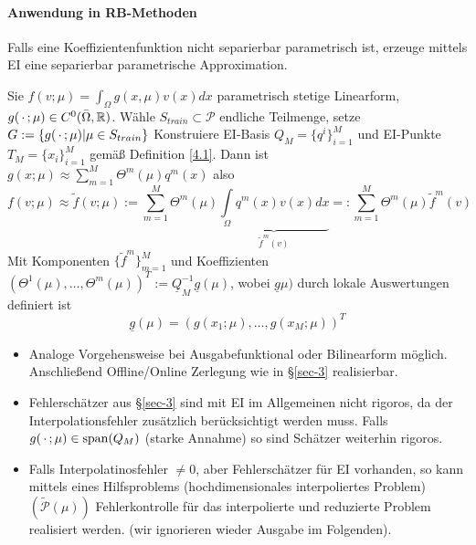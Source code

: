 \begin{satz}
\end{satz}
\begin{satz}
\end{satz}
\begin{satz}
\end{satz}
\begin{satz} \label{4.5}
\end{satz}
\begin{satz}
\end{satz}

\paragraph*{Anwendung in RB-Methoden}
Falls eine Koeffizientenfunktion nicht separierbar parametrisch ist, erzeuge mittels EI eine separierbar parametrische Approximation.

\begin{defn}
Sie $f(v; \mu) = \int_{\Omega} g(x, \mu) v(x) dx$ parametrisch stetige Linearform, $g(\,\cdot\,; \mu) \in C^0 (\bar{\Omega},\mathbb{R})$. Wähle $S_{train} \subset \mathcal{P}$ endliche Teilmenge, setze $G:= \{ g(\,\cdot\,;\mu) | \mu \in S_{train} \}$ Konstruiere EI-Basis $Q_M = \{q^i\}_{i=1}^M$ und EI-Punkte $T_M = \{x_i\}_{i=1}^M$ gemäß Definition \ref{4.1}. Dann ist $g(x;\mu) \approx \sum\limits_{m=1}^M \Theta^m(\mu)q^m(x)$ also
\[
	f(v;\mu) \approx \tilde{f}(v;\mu) := \sum\limits_{m=1}^M \Theta^m (\mu) \underbrace{\int\limits_{\Omega} q^m(x)v(x) dx}_{\tilde{f}^m(v)} =: \sum\limits_{m=1}^M \Theta^m(\mu) \tilde{f}^m(v)
\] 
Mit Komponenten $\{\tilde{f}^m\}_{m=1}^M$ und Koeffizienten $(\Theta^1(\mu), \dots, \Theta^m(\mu))^T := \underline{Q}_{M}^{-1} \underline{g}(\mu)$, wobei $\underline{g}\mu)$ durch lokale Auswertungen definiert ist
\[
	\underline{g}(\mu) = (g(x_1;\mu),\dots,g(x_M;\mu))^T
\]
\end{defn}

\begin{bem} \beginwithlistbem
	\begin{itemize}
		\item Analoge Vorgehensweise bei Ausgabefunktional oder Bilinearform möglich. Anschließend Offline/Online Zerlegung wie in §\ref{sec-3} realisierbar.
		\item Fehlerschätzer aus §\ref{sec-3} sind mit EI  im Allgemeinen nicht rigoros, da der Interpolationsfehler zusätzlich berücksichtigt werden muss. Falls $g(\,\cdot\,;\mu) \in \operatorname{span} (Q_M)$ (starke Annahme) so sind Schätzer weiterhin rigoros.
		\item Falls Interpolatinosfehler $\neq 0$, aber Fehlerschätzer für EI vorhanden, so kann mittels eines Hilfsproblems (hochdimensionales interpoliertes Problem) $(\tilde{\mathcal{P}}(\mu))$ Fehlerkontrolle für das interpolierte und reduzierte Problem realisiert werden. (wir ignorieren wieder Ausgabe im Folgenden).
	\end{itemize}
\end{bem}

